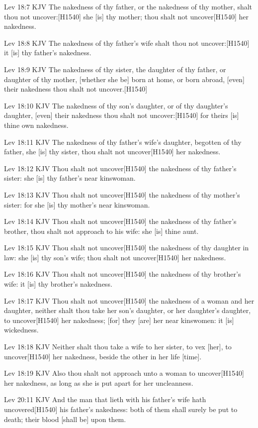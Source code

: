 \documentclass{book}
\begin{document}
Lev 18:7 KJV
The nakedness of thy father, or the nakedness of thy mother, shalt thou not uncover:[H1540] she [is] thy mother; thou shalt not uncover[H1540] her nakedness.

Lev 18:8 KJV
The nakedness of thy father's wife shalt thou not uncover:[H1540] it [is] thy father's nakedness.

Lev 18:9 KJV
The nakedness of thy sister, the daughter of thy father, or daughter of thy mother, [whether she be] born at home, or born abroad, [even] their nakedness thou shalt not uncover.[H1540]

Lev 18:10 KJV
The nakedness of thy son's daughter, or of thy daughter's daughter, [even] their nakedness thou shalt not uncover:[H1540] for theirs [is] thine own nakedness.

Lev 18:11 KJV
The nakedness of thy father's wife's daughter, begotten of thy father, she [is] thy sister, thou shalt not uncover[H1540] her nakedness.

Lev 18:12 KJV
Thou shalt not uncover[H1540] the nakedness of thy father's sister: she [is] thy father's near kinswoman.

Lev 18:13 KJV
Thou shalt not uncover[H1540] the nakedness of thy mother's sister: for she [is] thy mother's near kinswoman.

Lev 18:14 KJV
Thou shalt not uncover[H1540] the nakedness of thy father's brother, thou shalt not approach to his wife: she [is] thine aunt.

Lev 18:15 KJV
Thou shalt not uncover[H1540] the nakedness of thy daughter in law: she [is] thy son's wife; thou shalt not uncover[H1540] her nakedness.

Lev 18:16 KJV
Thou shalt not uncover[H1540] the nakedness of thy brother's wife: it [is] thy brother's nakedness.

Lev 18:17 KJV
Thou shalt not uncover[H1540] the nakedness of a woman and her daughter, neither shalt thou take her son's daughter, or her daughter's daughter, to uncover[H1540] her nakedness; [for] they [are] her near kinswomen: it [is] wickedness.

Lev 18:18 KJV
Neither shalt thou take a wife to her sister, to vex [her], to uncover[H1540] her nakedness, beside the other in her life [time].

Lev 18:19 KJV
Also thou shalt not approach unto a woman to uncover[H1540] her nakedness, as long as she is put apart for her uncleanness.

Lev 20:11 KJV
And the man that lieth with his father's wife hath uncovered[H1540] his father's nakedness: both of them shall surely be put to death; their blood [shall be] upon them.
\end{document}
